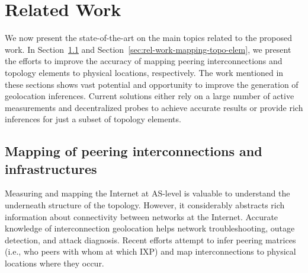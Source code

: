 \chapter{Related Work}\label{cap:related-work}
\thispagestyle{empty}

	We now present the state-of-the-art on the main topics related to the proposed work. 
	In Section~\ref{sec:rel-work-mapping-peer} and Section~\ref{sec:rel-work-mapping-topo-elem}, we present the efforts to improve the accuracy of mapping peering interconnections and topology elements to physical locations, respectively. The work mentioned in these sections shows vast potential and opportunity to improve the generation of geolocation inferences. Current solutions either rely on a large number of active measurements and decentralized probes to achieve accurate results or provide rich inferences for just a subset of topology elements.



	\section{Mapping of peering interconnections and infrastructures}
	\label{sec:rel-work-mapping-peer}

	Measuring and mapping the Internet at AS-level is valuable to understand the underneath structure of the topology. However, it considerably abstracts rich information about connectivity between networks at the Internet. Accurate knowledge of interconnection geolocation helps network troubleshooting, outage detection, and attack diagnosis. Recent efforts attempt to infer peering matrices (i.e., who peers with whom at which IXP) and map interconnections to physical locations where they occur. 

